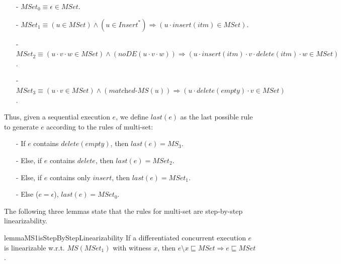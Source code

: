 {\begin{itemize}
\setlength{\itemsep}{0.5pt}
\item[-] $\textit{MSet}_0 \equiv \epsilon \in \textit{MSet}$.

\item[-] $\textit{MSet}_1 \equiv (u \in \textit{MSet}) \wedge
(u \in \textit{Insert}^*)
\Rightarrow
(u \cdot \textit{insert}(\textit{itm}) \in \textit{MSet})$.

\item[-] $\textit{MSet}_2 \equiv
(u \cdot v \cdot w \in \textit{MSet}) \wedge
(\textit{noDE}(u \cdot v \cdot w))
\Rightarrow
(u \cdot \textit{insert}(\textit{itm}) \cdot v \cdot \textit{delete}(\textit{itm}) \cdot w \in \textit{MSet})$.

\item[-] $\textit{MSet}_3 \equiv
(u \cdot v \in \textit{MSet}) \wedge
(\textit{matched-MS}(u) )
\Rightarrow
(u \cdot \textit{delete}(\textit{empty}) \cdot v \in \textit{MSet})$.
\end{itemize}

Thus, given a sequential execution $e$, we define $\textit{last}(e)$ as the last possible rule to generate $e$ according to the rules of multi-set:

\begin{itemize}
\setlength{\itemsep}{0.5pt}
\item[-] If $e$ contains $\textit{delete}(\textit{empty})$, then $\textit{last}(e) = \textit{MS}_3$.

\item[-] Else, if $e$ contains $\textit{delete}$, then $\textit{last}(e) = \textit{MSet}_2$.

\item[-] Else, if $e$ contains only $\textit{insert}$, then $\textit{last}(e) = \textit{MSet}_1$.

\item[-] Else ($e = \epsilon$), $\textit{last}(e) = \textit{MSet}_0$.
\end{itemize}

The following three lemmas state that the rules for multi-set are step-by-step linearizability.

\begin{restatable}{lemma}{MS1isStepByStepLinearizability}
\label{lemma:MS1 is step-by-step linearizability}
If a differentiated concurrent execution $e$ is linearizable w.r.t. $\textit{MS}(\textit{MSet}_1)$ with witness $x$, then $e \setminus x \sqsubseteq \textit{MSet} \Rightarrow e \sqsubseteq \textit{MSet}$.
\end{restatable}

}
